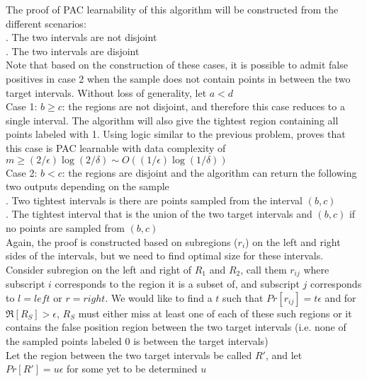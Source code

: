 \documentclass[11pt, oneside]{article}   	%
\begin{document}
The proof of PAC learnability of this algorithm will be constructed from the different scenarios:\\
. The two intervals are not disjoint\\
. The two intervals are disjoint\\
Note that based on the construction of these cases, it is possible to admit false positives in case 2 when the sample does not contain points in between the two target intervals.
Without loss of generality, let $a<d$\\
\indent Case 1: $b\geq c$: the regions are not disjoint, and therefore this case reduces to a single interval. The algorithm will also give the tightest region containing all points labeled with 1. Using logic similar to the previous problem, proves that this case is PAC learnable with data complexity of $m\geq(2/\epsilon)\log(2/\delta)\sim O((1/\epsilon) \log(1/\delta))$\\
\indent Case 2: $b<c$: the regions are disjoint and the algorithm can return the following two outputs depending on the sample\\
\indent{}. Two tightest intervals is there are points sampled from the interval $(b,c)$\\
\indent{}. The tightest interval that is the union of the two target intervals and $(b,c)$ if no points are sampled from $(b,c)$\\
\indent Again, the proof is constructed based on subregions ($r_i$) on the left and right sides of the intervals, but we need to find optimal size for these intervals. \\
\indent Consider subregion on the left and right of $R_1$ and $R_2$, call them $r_{ij}$ where subscript $i$ corresponds to the region it is a subset of, and subscript $j$ corresponds to $l=left$ or $r=right$. We would like to find a $t$ such that $Pr[r_{ij}]=t\epsilon$ and for $\Re[R_S]>\epsilon$, $R_S$ must either miss at least one of each of these such regions or it contains the false position region between the two target intervals (i.e. none of the sampled points labeled 0 is between the target intervals)\\
\indent Let the region between the two target intervals be called $R'$, and let $Pr[R']=u\epsilon$ for some yet to be determined $u$\\


\end{document}
